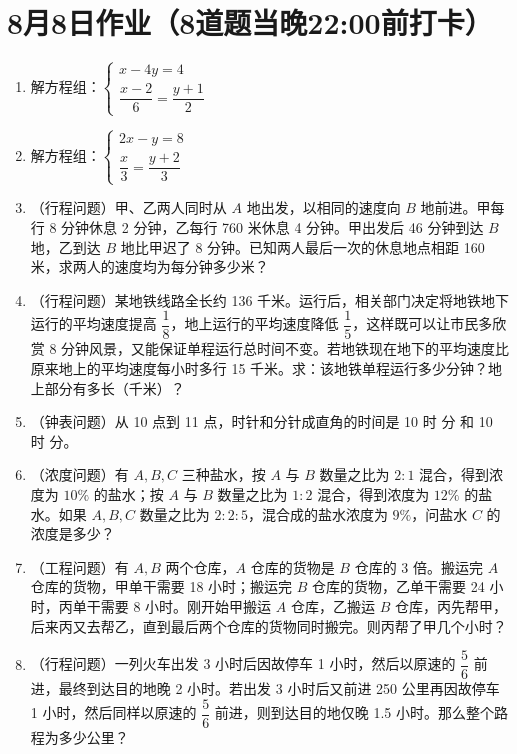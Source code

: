 \documentclass[UTF8,12pt,a4paper]{ctexart}
\newcommand{\BottomWriteSpace}{0.5cm}
\newenvironment{OnePageEightFill}{
  \small
  \vspace*{0pt}
  \begin{enumerate}[leftmargin=*, itemsep=0pt, topsep=0pt, parsep=0pt, partopsep=0pt]
  \setlength{\parskip}{0pt}
}{
  \end{enumerate}
  \vspace*{\BottomWriteSpace}
  \normalsize
  \newpage
}
\newcommand{\Q}[1]{\item #1\par\vfill}
\newcommand{\Qlast}[1]{\item #1\par}
\begin{document}
\section*{8月8日作业（8道题当晚22:00前打卡）}
\begin{OnePageEightFill}

\Q{解方程组：$\begin{cases} x - 4y = 4 \\ \dfrac{x-2}{6} = \dfrac{y+1}{2} \end{cases}$}

\Q{解方程组：$\begin{cases} 2x - y = 8 \\ \dfrac{x}{3} = \dfrac{y+2}{3} \end{cases}$}

\Q{（行程问题）甲、乙两人同时从 $A$ 地出发，以相同的速度向 $B$ 地前进。甲每行 8 分钟休息 2 分钟，乙每行 760 米休息 4 分钟。甲出发后 46 分钟到达 $B$ 地，乙到达 $B$ 地比甲迟了 8 分钟。已知两人最后一次的休息地点相距 160 米，求两人的速度均为每分钟多少米？}

\Q{（行程问题）某地铁线路全长约 136 千米。运行后，相关部门决定将地铁地下运行的平均速度提高 $\dfrac{1}{8}$，地上运行的平均速度降低 $\dfrac{1}{5}$，这样既可以让市民多欣赏 8 分钟风景，又能保证单程运行总时间不变。若地铁现在地下的平均速度比原来地上的平均速度每小时多行 15 千米。求：该地铁单程运行多少分钟？地上部分有多长（千米）？}

\Q{（钟表问题）从 10 点到 11 点，时针和分针成直角的时间是 10 时 \underline{\hspace{3em}} 分 和 10 时 \underline{\hspace{3em}} 分。}

\Q{（浓度问题）有 $A, B, C$ 三种盐水，按 $A$ 与 $B$ 数量之比为 $2:1$ 混合，得到浓度为 $10\%$ 的盐水；按 $A$ 与 $B$ 数量之比为 $1:2$ 混合，得到浓度为 $12\%$ 的盐水。如果 $A, B, C$ 数量之比为 $2:2:5$，混合成的盐水浓度为 $9\%$，问盐水 $C$ 的浓度是多少？}

\Q{（工程问题）有 $A, B$ 两个仓库，$A$ 仓库的货物是 $B$ 仓库的 3 倍。搬运完 $A$ 仓库的货物，甲单干需要 18 小时；搬运完 $B$ 仓库的货物，乙单干需要 24 小时，丙单干需要 8 小时。刚开始甲搬运 $A$ 仓库，乙搬运 $B$ 仓库，丙先帮甲，后来丙又去帮乙，直到最后两个仓库的货物同时搬完。则丙帮了甲几个小时？}

\Qlast{（行程问题）一列火车出发 3 小时后因故停车 1 小时，然后以原速的 $\dfrac{5}{6}$ 前进，最终到达目的地晚 2 小时。若出发 3 小时后又前进 250 公里再因故停车 1 小时，然后同样以原速的 $\dfrac{5}{6}$ 前进，则到达目的地仅晚 1.5 小时。那么整个路程为多少公里？}

\end{OnePageEightFill}
\end{document}
